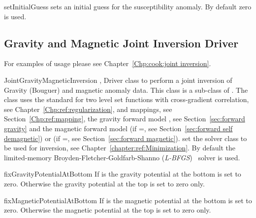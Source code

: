 \begin{methoddesc}[MagneticInversion]{setInitialGuess}{}
sets an initial guess for the susceptibility anomaly. By default zero is used.
\end{methoddesc}

\subsection{Gravity and Magnetic Joint Inversion Driver}
For examples of usage please see Chapter~\ref{Chp:cook:joint inversion}.

\begin{classdesc}{JointGravityMagneticInversion}{
, 
}
Driver class to perform a joint inversion of Gravity (Bouguer) and magnetic anomaly data.
This class is a sub-class of . 
The class uses the standard  for two level set functions
with cross-gradient correlation, see Chapter~\ref{Chp:ref:regularization},
 and  mappings, see Section~\ref{Chp:ref:mapping}, the 
gravity forward model , see Section~\ref{sec:forward gravity}
and the magnetic forward model  (if =\True,
see Section~\ref{sec:forward self demagnetic}) or   
(if =\False, see Section~\ref{sec:forward magnetic}).
 set the solver class to be used for inversion,
see Chapter~\ref{chapter:ref:Minimization}.
 By default the limited-memory Broyden-Fletcher-Goldfarb-Shanno (\emph{L-BFGS})~\cite{Nocedal1980} solver is used.
\end{classdesc}

\begin{methoddesc}[JointGravityMagneticInversion]{fixGravityPotentialAtBottom}{}
If  is \True the gravity potential at the bottom is set to zero. Otherwise  the gravity
 potential at the top is set to zero only. 
\end{methoddesc}


\begin{methoddesc}[JointGravityMagneticInversion]{fixMagneticPotentialAtBottom}{}
If  is \True the magnetic potential at the bottom is set to zero. Otherwise  the magnetic
 potential at the top is set to zero only. 
\end{methoddesc}

